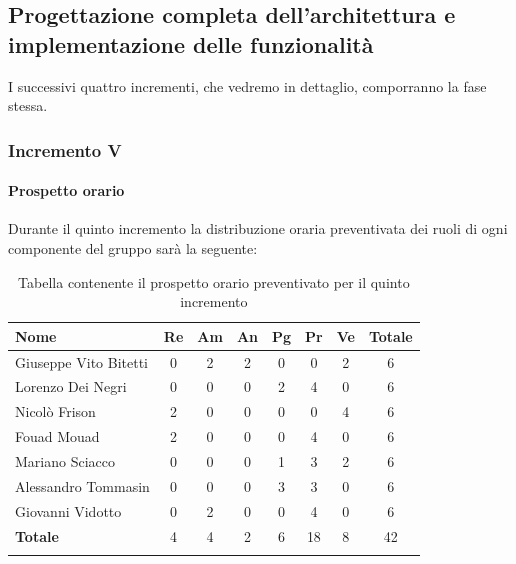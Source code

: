 		
	\pagebreak
	\subsection{Progettazione completa dell'architettura e implementazione delle funzionalità}
	I successivi quattro incrementi, che vedremo in dettaglio, comporranno la fase stessa.
		\subsubsection{Incremento V}
			\paragraph{Prospetto orario}
			Durante il quinto incremento la distribuzione oraria preventivata dei ruoli di ogni componente del gruppo sarà la seguente:
			
			\begin{longtable}{|l|c|c|c|c|c|c|c|}
				\hline
				\rowcolor{lighter-grayer}
				\textbf{Nome} & \textbf{Re} & \textbf{Am} & \textbf{An} & \textbf{Pg}  & \textbf{Pr}   & \textbf{Ve} & \textbf{Totale} \\
				\hline
				\endfirsthead
				
				\hline
				Giuseppe Vito Bitetti 		 & 0 & 2 & 2 & 0 & 0 & 2 & 6\\
				\hline
				\hline
				Lorenzo Dei Negri			 & 0 & 0 & 0 & 2 & 4 & 0 & 6\\
				\hline
				\hline
				Nicolò Frison				    & 2 & 0 & 0 & 0 & 0 & 4 & 6\\
				\hline
				\hline
				Fouad Mouad 				 & 2 & 0 & 0 & 0 & 4 & 0 & 6\\
				\hline
				\hline
				Mariano Sciacco 			 & 0 & 0 & 0 & 1 & 3 & 2 & 6\\
				\hline
				\hline
				Alessandro Tommasin     & 0 & 0 & 0 & 3 & 3 & 0 & 6\\
				\hline
				\hline
				Giovanni Vidotto 			 & 0 & 2 & 0 & 0 & 4 & 0 & 6\\
				\hline 
				\textbf{Totale}			 		& 4 & 4 & 2 & 6 & 18 & 8 & 42\\
				\hline
				\caption{Tabella contenente il prospetto orario preventivato per il quinto incremento}
			\end{longtable}
			
